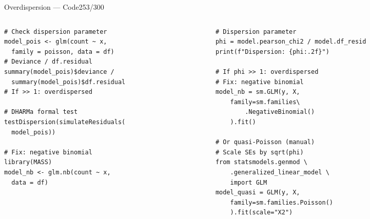 \documentclass[10pt]{beamer}
\newcommand{\smark}[1]{\hfill{\scriptsize\color{codegray}#1}}
\begin{document}
\begin{frame}[fragile]{Overdispersion --- Code}\smark{253/300}
\begin{columns}[T]
\begin{column}{0.48\textwidth}
\begin{lstlisting}[style=Rstyle]
# Check dispersion parameter
model_pois <- glm(count ~ x,
  family = poisson, data = df)
# Deviance / df.residual
summary(model_pois)$deviance /
  summary(model_pois)$df.residual
# If >> 1: overdispersed

# DHARMa formal test
testDispersion(simulateResiduals(
  model_pois))

# Fix: negative binomial
library(MASS)
model_nb <- glm.nb(count ~ x,
  data = df)
\end{lstlisting}
\end{column}
\begin{column}{0.48\textwidth}
\begin{lstlisting}[style=Pystyle]
# Dispersion parameter
phi = model.pearson_chi2 / model.df_resid
print(f"Dispersion: {phi:.2f}")

# If phi >> 1: overdispersed
# Fix: negative binomial
model_nb = sm.GLM(y, X,
    family=sm.families\
        .NegativeBinomial()
    ).fit()

# Or quasi-Poisson (manual)
# Scale SEs by sqrt(phi)
from statsmodels.genmod \
    .generalized_linear_model \
    import GLM
model_quasi = GLM(y, X,
    family=sm.families.Poisson()
    ).fit(scale="X2")
\end{lstlisting}
\end{column}
\end{columns}
\end{frame}
\end{document}
